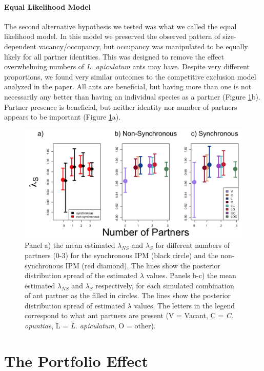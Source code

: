 \documentclass[11pt]{article}
\begin{document}
\paragraph{Equal Likelihood Model}
The second alternative hypothesis we tested was what we called the equal likelihood model.
In this model we preserved the observed pattern of size-dependent vacancy/occupancy, but occupancy was manipulated to be equally likely for all partner identities. 
This was designed to remove the effect overwhelming numbers of \textit{L. apiculatum} ants may have. 
Despite very different proportions, we found very similar outcomes to the competitive exclusion model analyzed in the paper. 
All ants are beneficial, but having more than one is not necessarily any better than having an individual species as a partner (Figure \ref{app:EqualLambdaMeans}b).
Partner presence is beneficial, but neither identity nor number of partners appears to be important (Figure \ref{app:EqualLambdaMeans}a).

\begin{figure}
\includegraphics[width=0.91\linewidth]{Figures/Lambdas_equal_lines.png}
	\caption{Panel a) the mean estimated $\lambda_{NS}$ and $\lambda_{S}$ for different numbers of partners (0-3) for the synchronous IPM (black circle) and the non-synchronous IPM (red diamond). The lines show the posterior distribution spread of the estimated $\lambda$ values. Panels b-c) the mean estimated $\lambda_{NS}$ and $\lambda_{S}$ respectively, for each simulated combination of ant partner as the filled in circles. The lines show the posterior distribution spread of estimated $\lambda$ values. The letters in the legend correspond to what ant partners are present (V = Vacant, C = \textit{C. opuntiae}, L = \textit{L. apiculatum}, O = other).}
\label{app:EqualLambdaMeans}
\end{figure}


\section*{The Portfolio Effect}\label{appendix:D}
\renewcommand{\thefigure}{D\arabic{figure}}
\end{document}
